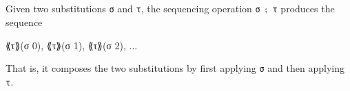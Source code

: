 \begin{fence}
\begin{code}%
\>[0]\AgdaSpace{}%
\AgdaSpace{}%
\<%
\\
%
\\[\AgdaEmptyExtraSkip]%
\>[0]\AgdaSpace{}%
\AgdaSymbol{:}\AgdaSpace{}%
\AgdaSpace{}%
\AgdaSpace{}%
\AgdaSymbol{\}}\AgdaSpace{}%
\AgdaSpace{}%
\AgdaSymbol{(}\AgdaSpace{}%
\AgdaSpace{}%
\AgdaSymbol{)}\AgdaSpace{}%
\AgdaSpace{}%
\AgdaSpace{}%
\AgdaSpace{}%
\AgdaSpace{}%
\AgdaSpace{}%
\AgdaSpace{}%
\AgdaSymbol{(}\AgdaSpace{}%
\AgdaOperator{\AgdaInductiveConstructor{,}}\AgdaSpace{}%
\AgdaSymbol{)}\AgdaSpace{}%
\<%
\\
\>[0]\AgdaSymbol{(}\AgdaSpace{}%
\AgdaSpace{}%
\AgdaSymbol{)}\AgdaSpace{}%
\AgdaSpace{}%
\AgdaSymbol{=}\AgdaSpace{}%
\<%
\\
\>[0]\AgdaSymbol{(}\AgdaSpace{}%
\AgdaSpace{}%
\AgdaSymbol{)}\AgdaSpace{}%
\AgdaSymbol{(}\AgdaSpace{}%
\AgdaSymbol{)}\AgdaSpace{}%
\AgdaSymbol{=}\AgdaSpace{}%
\AgdaSpace{}%
\<%
\end{code}
\end{fence}

Given two substitutions \texttt{σ} and \texttt{τ}, the sequencing
operation \texttt{σ\ ⨟\ τ} produces the sequence

\begin{myDisplay}
⟪τ⟫(σ 0), ⟪τ⟫(σ 1), ⟪τ⟫(σ 2), ...
\end{myDisplay}

That is, it composes the two substitutions by first applying \texttt{σ}
and then applying \texttt{τ}.

